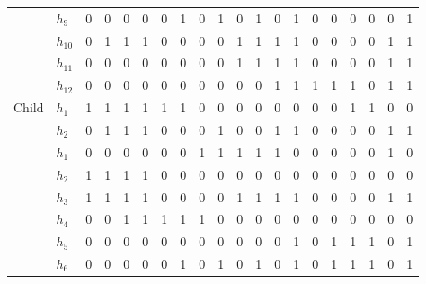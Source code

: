 \begin{table}
\begin{adjustbox}{width=0.8\textwidth}
\begin{tabular}{cl|cccc cccc cccc cccc | cc}
				&	$h_9$ & 0  & 0 & 0  & 0  & 0 & 1 & 0 & 1  & 0 & 1	 & 0 & 1  & 0 & 0  & 0 & 0 & 0 & 1\\
				&	$h_{10}$   & 0  & 1 & 1  & 1  & 0 & 0 & 0 & 0  & 1 & 1 & 1 & 1  & 0 & 0  & 0 & 0 & 1 & 1\\
				&	$h_{11}$   & 0  & 0 & 0  & 0  & 0 & 0 & 0 & 0  & 1 & 1 & 1 & 1  & 0 & 0  & 0 & 0 & 1 & 1\\
				&	$h_{12}$   & 0  & 0 & 0  & 0  & 0 & 0 & 0 & 0  & 0 & 0 & 1 & 1  & 1 & 1  & 1 & 0 & 1 & 1\\
			\midrule
			\multirow{8}{*}{Child}	
				   &	$h_1$ & 1  & 1 & 1  & 1  & 1 & 1 & 0 & 0  & 0 & 0 & 0 & 0  & 0 & 0  & 1 & 1 & 0 & 0\\
				&	$h_2$ & 0  & 1 & 1  & 1  & 0 & 0 & 0 & 1  & 0 & 0 & 1 & 1  & 0 & 0  & 0 & 0 & 1 & 1\\
				&	$h_1$ & 0  & 0 & 0  & 0  & 0 & 0 & 1 & 1  & 1 & 1	 & 1 & 0  & 0 & 0  & 0 & 0 & 1 & 0\\
				&	$h_2$ & 1  & 1 & 1  & 1  & 0 & 0 & 0 & 0  & 0 & 0	 & 0 & 0  & 0 & 0  & 0 & 0 & 0 & 0\\
				&	$h_3$ & 1  & 1 & 1  & 1  & 0 & 0 & 0 & 0  & 1 & 1	 & 1 & 1  & 0 & 0  & 0 & 0 & 1 & 1\\
				&	$h_4$ & 0  & 0 & 1  & 1  & 1 & 1 & 1 & 0  & 0 & 0	 & 0 & 0  & 0 & 0  & 0 & 0 & 0 & 0\\
				&	$h_5$ & 0  & 0 & 0  & 0  & 0 & 0 & 0 & 0  & 0 & 0	 & 0 & 1  & 0 & 1  & 1 & 1 & 0 & 1\\
				&	$h_6$ & 0  & 0 & 0  & 0  & 0 & 1 & 0 & 1  & 0 & 1	 & 0 & 1  & 0 & 1  & 1 & 1 & 0 & 1\\
			\bottomrule
			\end{tabular}
		\end{adjustbox}
\end{table}
\renewcommand{\arraystretch}{2}
